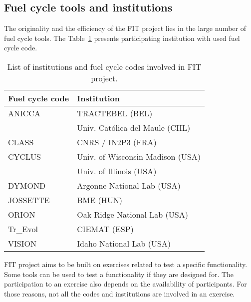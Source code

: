 \subsection{Fuel cycle tools and institutions}

The originality and the efficiency of the FIT project lies in the large number
of fuel cycle tools. The Table~\ref{Tab:Code} presents participating institution
with used fuel cycle code.

\begin{table}[h]
\centering
\begin{tabular}{ |l|l| }
  \hline
  Fuel cycle code & Institution \\
  \hline
  ANICCA\cite{} & TRACTEBEL (BEL) \\
   & Univ. Católica del Maule (CHL) \\
  \hline
  CLASS\cite{Thiolliere_2018} & CNRS / IN2P3 (FRA) \\
  \hline
  CYCLUS\cite{} & Univ. of Wisconsin Madison (USA) \\
  & Univ. of Illinois (USA) \\
  \hline
  DYMOND\cite{} & Argonne National Lab (USA) \\
  \hline
  JOSSETTE\cite{} & BME (HUN) \\
  \hline
  ORION\cite{} & Oak Ridge National Lab (USA) \\
  \hline
  Tr\_Evol\cite{} & CIEMAT (ESP) \\
  \hline
  VISION\cite{jacobson2009vision} & Idaho National Lab (USA) \\
  \hline
\end{tabular}
\label{Tab:Code}
\caption{List of institutions and fuel cycle codes involved in FIT project.}
\end{table}

FIT project aims to be built on exercises related to test a specific
functionality. Some tools can be used to test a functionality if they are
designed for. The participation to an exercise also depends on the availability
of participants. For those reasons, not all the codes and institutions are
involved in an exercise.
